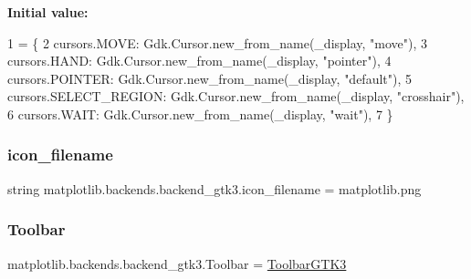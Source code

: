 {\bfseries Initial value\+:}
\begin{DoxyCode}
1 =  \{
2         cursors.MOVE:          Gdk.Cursor.new\_from\_name(\_display, \textcolor{stringliteral}{"move"}),
3         cursors.HAND:          Gdk.Cursor.new\_from\_name(\_display, \textcolor{stringliteral}{"pointer"}),
4         cursors.POINTER:       Gdk.Cursor.new\_from\_name(\_display, \textcolor{stringliteral}{"default"}),
5         cursors.SELECT\_REGION: Gdk.Cursor.new\_from\_name(\_display, \textcolor{stringliteral}{"crosshair"}),
6         cursors.WAIT:          Gdk.Cursor.new\_from\_name(\_display, \textcolor{stringliteral}{"wait"}),
7     \}
\end{DoxyCode}
\mbox{\label{namespacematplotlib_1_1backends_1_1backend__gtk3_a77525c76e1f137bd35eb0b4faca11603}} 
\subsubsection{\texorpdfstring{icon\+\_\+filename}{icon\_filename}}
{\footnotesize\ttfamily string matplotlib.\+backends.\+backend\+\_\+gtk3.\+icon\+\_\+filename = \textquotesingle{}matplotlib.\+png\textquotesingle{}}

\mbox{\label{namespacematplotlib_1_1backends_1_1backend__gtk3_add286d329be46619f7fc9e8bc2e91f83}} 
\subsubsection{\texorpdfstring{Toolbar}{Toolbar}}
{\footnotesize\ttfamily matplotlib.\+backends.\+backend\+\_\+gtk3.\+Toolbar = \hyperlink{classmatplotlib_1_1backends_1_1backend__gtk3_1_1ToolbarGTK3}{Toolbar\+G\+T\+K3}}

\mbox{\label{namespacematplotlib_1_1backends_1_1backend__gtk3_a38f8918379cdf9b09276099da8680253}} 
